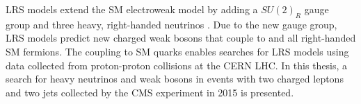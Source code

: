 LRS models extend the SM electroweak model by adding a $SU(2)_{R}$ gauge group and three heavy, right-handed 
neutrinos \nul.  Due to the new gauge group, LRS models predict new charged weak bosons \WR that couple to 
\nul and all right-handed SM fermions.  The \WR coupling to SM quarks enables searches for LRS models using 
data collected from proton-proton collisions at the CERN LHC.  In this thesis, a search for heavy neutrinos \nul 
and weak bosons \WR in events with two charged leptons and two jets collected by the CMS experiment in 2015 
is presented.

